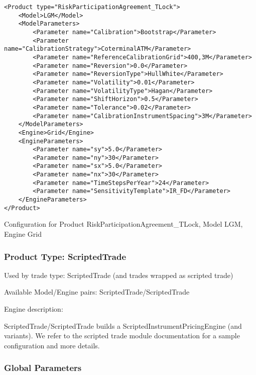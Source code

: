 \begin{longlisting}
\begin{verbatim}
<Product type="RiskParticipationAgreement_TLock">
    <Model>LGM</Model>
    <ModelParameters>
        <Parameter name="Calibration">Bootstrap</Parameter>
        <Parameter name="CalibrationStrategy">CoterminalATM</Parameter>
        <Parameter name="ReferenceCalibrationGrid">400,3M</Parameter>
        <Parameter name="Reversion">0.0</Parameter>
        <Parameter name="ReversionType">HullWhite</Parameter>
        <Parameter name="Volatility">0.01</Parameter>
        <Parameter name="VolatilityType">Hagan</Parameter>
        <Parameter name="ShiftHorizon">0.5</Parameter>
        <Parameter name="Tolerance">0.02</Parameter>
        <Parameter name="CalibrationInstrumentSpacing">3M</Parameter>
    </ModelParameters>
    <Engine>Grid</Engine>
    <EngineParameters>
        <Parameter name="sy">5.0</Parameter>
        <Parameter name="ny">30</Parameter>
        <Parameter name="sx">5.0</Parameter>
        <Parameter name="nx">30</Parameter>
        <Parameter name="TimeStepsPerYear">24</Parameter>
        <Parameter name="SensitivityTemplate">IR_FD</Parameter>
    </EngineParameters>
</Product>
\end{verbatim}
\caption{Configuration for Product RiskParticipationAgreement\_TLock, Model LGM, Engine Grid}
\label{lst:peconfig_RiskParticipationAgreement_TLock_LGM_Grid}
\end{longlisting}


\subsubsection{Product Type: ScriptedTrade}

Used by trade type: ScriptedTrade (and trades wrapped as scripted trade)

Available Model/Engine pairs: ScriptedTrade/ScriptedTrade

Engine description:

ScriptedTrade/ScriptedTrade builds a ScriptedInstrumentPricingEngine (and variants). We refer to the scripted trade
module documentation for a sample configuration and more details.

\subsubsection{Global Parameters}

